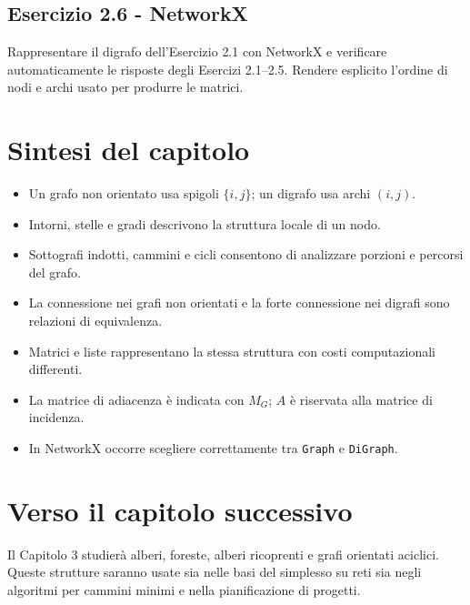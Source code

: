 \documentclass[11pt,a4paper]{article}
\begin{document}
\subsection*{Esercizio 2.6 - NetworkX}
Rappresentare il digrafo dell'Esercizio 2.1 con NetworkX e verificare automaticamente le risposte degli Esercizi 2.1--2.5. Rendere esplicito l'ordine di nodi e archi usato per produrre le matrici.

\section{Sintesi del capitolo}

\begin{tcolorbox}[colback=softred,colframe=sapienzared,boxrule=0.8pt,arc=1.5mm]
\begin{itemize}[nosep]
\item Un grafo non orientato usa spigoli $\{i,j\}$; un digrafo usa archi $(i,j)$.
\item Intorni, stelle e gradi descrivono la struttura locale di un nodo.
\item Sottografi indotti, cammini e cicli consentono di analizzare porzioni e percorsi del grafo.
\item La connessione nei grafi non orientati e la forte connessione nei digrafi sono relazioni di equivalenza.
\item Matrici e liste rappresentano la stessa struttura con costi computazionali differenti.
\item La matrice di adiacenza è indicata con $M_G$; $A$ è riservata alla matrice di incidenza.
\item In NetworkX occorre scegliere correttamente tra \texttt{Graph} e \texttt{DiGraph}.
\end{itemize}
\end{tcolorbox}

\section*{Verso il capitolo successivo}
Il Capitolo 3 studierà alberi, foreste, alberi ricoprenti e grafi orientati aciclici. Queste strutture saranno usate sia nelle basi del simplesso su reti sia negli algoritmi per cammini minimi e nella pianificazione di progetti.
\end{document}
